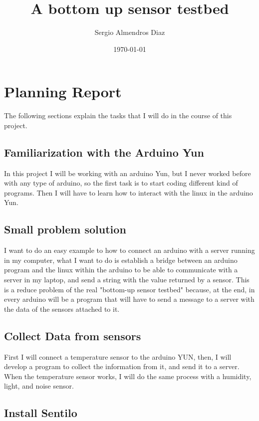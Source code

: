 \documentclass[10pt,a4paper]{article}
\title{A bottom up sensor testbed}
\author{Sergio Almendros Diaz}
\date{\today}
\begin{document}
\maketitle

\section{Planning Report}

The following sections explain the tasks that I will do in the course of this project.

\subsection{Familiarization with the Arduino Yun}

In this project I will be working with an arduino Yun, but I never worked before with any type of arduino, so the first task is to start coding different kind of programs. Then I will have to learn how to interact with the linux in the arduino Yun.

\subsection{Small problem solution}

I want to do an easy example to how to connect an arduino with a server running in my computer, what I want to do is establish a bridge between an arduino program and the linux within the arduino to be able to communicate with a server in my laptop, and send a string with the value returned by a sensor.
This is a reduce problem of the real "bottom-up sensor testbed" because, at the end, in every arduino will be a program that will have to send a message to a server with the data of the sensors attached to it.

\subsection{Collect Data from sensors}

First I will connect a temperature sensor to the arduino YUN, then, I will develop a program to collect the information from it, and send it to a server.
When the temperature sensor works, I will do the same process with a humidity, light, and noise sensor.

\subsection{Install Sentilo}
\end{document}

